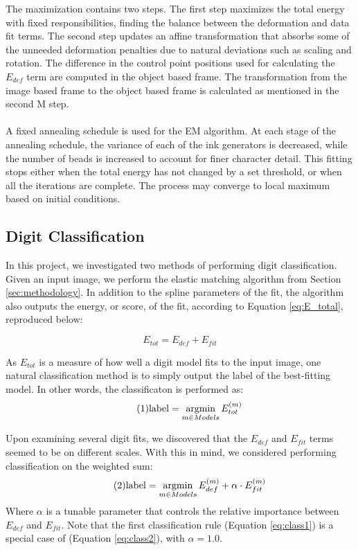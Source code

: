 \documentclass[oribibl]{llncs}
\newcommand\numberthis{\addtocounter{equation}{1}\tag{\theequation}} %
\newcommand{\argmin}{\operatornamewithlimits{argmin}}
\begin{document}
The maximization contains two steps. The first step maximizes the total energy with fixed responsibilities, finding the balance between the deformation and data fit terms. The second step updates an affine transformation that absorbs some of the unneeded deformation penalties due to natural deviations such as scaling and rotation. The difference in the control point positions used for calculating the $E_{def}$ term are computed in the object based frame. The transformation from the image based frame to the object based frame is calculated as mentioned in the second M step.
\\
\\
A fixed annealing schedule is used for the EM algorithm. At each stage of the annealing schedule, the variance of each of the ink generators is decreased, while the number of beads is increased to account for finer character detail. This fitting stops either when the total energy has not changed by a set threshold, or when all the iterations are complete. The process may converge to local maximum based on initial conditions.

\subsection{Digit Classification}
\label{sec:classify}

In this project, we investigated two methods of performing digit classification.
Given an input image, we perform the elastic matching algorithm from Section \ref{sec:methodology}. 
In addition to the spline parameters of the fit, the algorithm also outputs the energy, or score, of the fit, according to Equation \ref{eq:E_total}, reproduced below:

\begin{equation*}
    E_{tot} = E_{def} + E_{fit}
\end{equation*}    

As $E_{tot}$ is a measure of how well a digit model fits to the input image, one natural classification method is to simply output the label of the best-fitting model.
In other words, the classificaton is performed as:
\begin{equation*}
\numberthis \label{eq:class1}
\text{label} = \argmin_{m \in Models}{E_{tot}^{(m)}}
\end{equation*}

Upon examining several digit fits, we discovered that the $E_{def}$ and $E_{fit}$ terms seemed to be on different scales.
With this in mind, we considered performing classification on the weighted sum:
\begin{equation*}
\numberthis \label{eq:class2}
\text{label} = \argmin_{m \in Models}{E_{def}^{(m)} + \alpha \cdot E_{fit}^{(m)}}
\end{equation*}
Where $\alpha$ is a tunable parameter that controls the relative importance between $E_{def}$ and $E_{fit}$.
Note that the first classification rule (Equation \ref{eq:class1}) is a special case of (Equation \ref{eq:class2}), with $\alpha = 1.0$.
\end{document}
